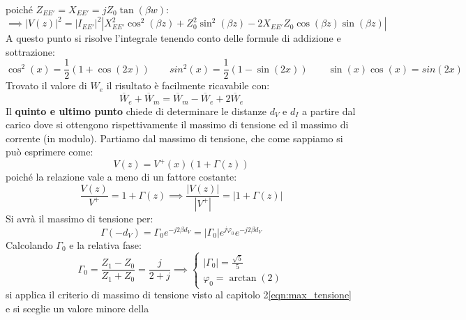 \documentclass{book}
\begin{document}
        poiché $Z_{EE'}=X_{EE'}=jZ_{0}\tan(\beta w)$:
        \begin{equation}
            \implies |V(z)| ^{2} = |I_{EE'}| ^{2}|X_{EE'}^{2}\cos^{2}(\beta z)+Z_{0}^{2}\sin^{2}(\beta z)-2X_{EE'}Z_{0}\cos(\beta z)\sin(\beta z)|
        \end{equation}
        A questo punto si risolve l'integrale tenendo conto delle formule di addizione e sottrazione:
        \begin{equation}
            \cos^{2}(x)=\frac{1}{2}(1+\cos(2x)) \qquad sin^{2}(x)=\frac{1}{2}(1-\sin(2x)) \qquad \sin(x)\cos(x)=sin(2x)
        \end{equation}
        Trovato il valore di $W_{e}$ il risultato è facilmente ricavabile con:
        \begin{equation}
            \overline{W}_{e}+\overline{W}_{m}=\overline{W}_{m}-\overline{W}_{e}+2 \overline{W}_{e}
        \end{equation}
        Il \textbf{quinto e ultimo punto} chiede di determinare le distanze $d_{V}$ e $d_{I}$ a partire dal carico dove si ottengono 
        rispettivamente il massimo di tensione ed il massimo di corrente (in modulo). Partiamo dal massimo di tensione, che come sappiamo si può
        esprimere come:
        \begin{equation}
            V(z)=V^{+}(x)(1+\Gamma (z))
        \end{equation}
        poiché la relazione vale a meno di un fattore costante:
        \begin{equation}
            \frac{V(z)}{V^{+}}=1+\Gamma(z) \implies \frac{|V(z)|}{|V^{+}|} = |1+\Gamma (z)|
        \end{equation}
        Si avrà il massimo di tensione per:
        \begin{equation}
            \Gamma (-d_{V}) = \Gamma_{0}e^{-j2 \beta d_{V}} = |\Gamma_{0}|e^{j \varphi_{0}}e^{-j 2 \beta d_{V}}
        \end{equation}
        Calcolando $\Gamma_{0}$ e la relativa fase:
        \begin{equation}
            \Gamma_{0} = \frac{Z_{1}-Z_{0}}{Z_{1}+Z_{0}} = \frac{j}{2+j} \implies 
            \begin{cases}
                |\Gamma_{0}| = \frac{\sqrt{5}}{5} \\ \varphi_{0}=\arctan(2)    
            \end{cases}
        \end{equation}
        si applica il criterio di massimo di tensione visto al capitolo 2\ref{eqn:max_tensione} e si sceglie un valore minore della 
\end{document}
